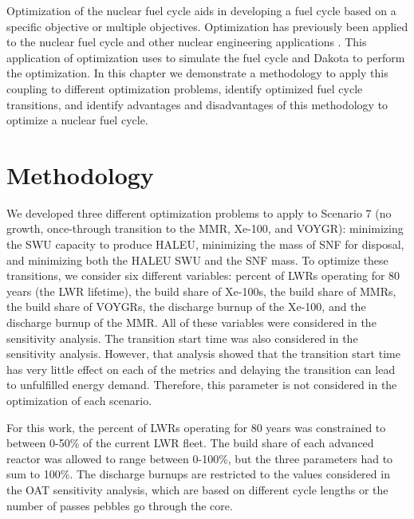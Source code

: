 Optimization of the nuclear fuel cycle aids in developing
a fuel cycle based on a specific objective or  multiple objectives. 
Optimization has previously been applied to the nuclear fuel 
cycle \cite{passerini_sensitivity_2012,andrianov_optimization_2019}
and other nuclear engineering applications 
\cite{chee_fluoride-salt-cooled_2022}.
This application of optimization uses \Cyclus \cite{huff_fundamental_2016}
to simulate the fuel cycle and Dakota \cite{adams_dakota_2021} to 
perform the optimization. In this chapter we demonstrate a methodology to 
apply this coupling to different optimization problems, identify 
optimized fuel cycle transitions, and identify 
advantages and disadvantages of this methodology to optimize a nuclear 
fuel cycle. 

\section{Methodology}
We developed three different optimization problems to apply to 
Scenario 7 (no growth, once-through transition to the \gls{MMR}, Xe-100, 
and VOYGR): minimizing the \gls{SWU} capacity to 
produce \gls{HALEU}, minimizing the mass of \gls{SNF} for disposal, 
and minimizing both the \gls{HALEU} \gls{SWU} and the \gls{SNF} 
mass. To optimize these transitions, we consider six different 
variables: percent of \glspl{LWR} operating for 80 years (the \gls{LWR} 
lifetime), the build share 
of Xe-100s, the build share of \glspl{MMR}, the build share of VOYGRs, 
the discharge burnup of the Xe-100, and the discharge burnup of the 
\gls{MMR}. All of these variables were considered in the sensitivity 
analysis. The transition start time was also considered in the sensitivity 
analysis. However, that analysis showed that the transition start time has
very little effect on each of the metrics and delaying the transition 
can lead to unfulfilled energy demand. Therefore, this parameter is 
not considered in the optimization of each scenario. 

For this work, the percent of \glspl{LWR} operating for 80 years 
was constrained to between 0-50\% of the current \gls{LWR} fleet. 
The build share of each advanced reactor was allowed to range between 
0-100\%, but the three parameters had to sum to 100\%. The discharge 
burnups are restricted to the values considered in the \gls{OAT} 
sensitivity analysis, which are based on different cycle lengths or 
the number of passes pebbles go through the core.

